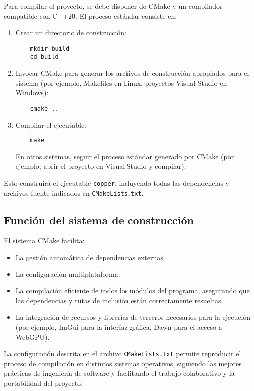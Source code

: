 Para compilar el proyecto, se debe disponer de CMake y un compilador compatible
con C++20. El proceso estándar consiste en:

\begin{enumerate}
    \item Crear un directorio de construcción:
          \begin{lstlisting}
    mkdir build
    cd build
    \end{lstlisting}

    \item Invocar CMake para generar los archivos de construcción apropiados para el
          sistema (por ejemplo, Makefiles en Linux, proyectos Visual Studio en Windows):
          \begin{lstlisting}
    cmake ..
    \end{lstlisting}

    \item Compilar el ejecutable:
          \begin{lstlisting}
    make
    \end{lstlisting}
          En otros sistemas, seguir el proceso estándar generado por CMake (por ejemplo,
          abrir el proyecto en Visual Studio y compilar).
\end{enumerate}

Esto construirá el ejecutable \texttt{copper}, incluyendo todas las
dependencias y archivos fuente indicados en \texttt{CMakeLists.txt}.

\subsection{Función del sistema de construcción}

El sistema CMake facilita:

\begin{itemize}
    \item La gestión automática de dependencias externas.
    \item La configuración multiplataforma.
    \item La compilación eficiente de todos los módulos del programa, asegurando que las
          dependencias y rutas de inclusión están correctamente resueltas.
    \item La integración de recursos y librerías de terceros necesarios para la ejecución
          (por ejemplo, ImGui para la interfaz gráfica, Dawn para el acceso a WebGPU).
\end{itemize}

La configuración descrita en el archivo \texttt{CMakeLists.txt} permite
reproducir el proceso de compilación en distintos sistemas operativos,
siguiendo las mejores prácticas de ingeniería de software y facilitando el
trabajo colaborativo y la portabilidad del proyecto.